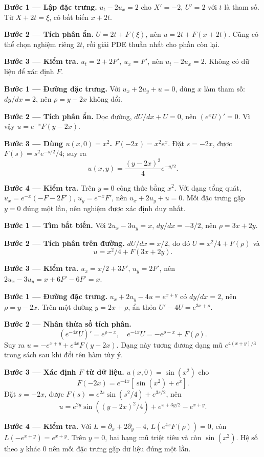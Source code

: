 \textbf{Bước 1 — Lập đặc trưng.} $u_t-2u_x=2$ cho $X'=-2$, $U'=2$ với $t$ là tham số. Từ $X+2t=\xi$, có bất biến $x+2t$.

\textbf{Bước 2 — Tích phân ẩn.} $U=2t+F(\xi)$, nên $u=2t+F(x+2t)$. Cũng có thể chọn nghiệm riêng $2t$, rồi giải PDE thuần nhất cho phần còn lại.

\textbf{Bước 3 — Kiểm tra.} $u_t=2+2F'$, $u_x=F'$, nên $u_t-2u_x=2$. Không có dữ liệu để xác định $F$.

\textbf{Bước 1 — Đường đặc trưng.} Với $u_x+2u_y+u=0$, dùng $x$ làm tham số: $dy/dx=2$, nên $\rho=y-2x$ không đổi.

\textbf{Bước 2 — Tích phân ẩn.} Dọc đường, $dU/dx+U=0$, nên $(e^xU)'=0$. Vì vậy $u=e^{-x}F(y-2x)$.

\textbf{Bước 3 — Dùng $u(x,0)=x^2$.} $F(-2x)=x^2e^x$. Đặt $s=-2x$, được $F(s)=s^2e^{-s/2}/4$; suy ra
\[u(x,y)=\frac{(y-2x)^2}{4}e^{-y/2}.\]

\textbf{Bước 4 — Kiểm tra.} Trên $y=0$ công thức bằng $x^2$. Với dạng tổng quát, $u_x=e^{-x}(-F-2F')$, $u_y=e^{-x}F'$, nên $u_x+2u_y+u=0$. Mỗi đặc trưng gặp $y=0$ đúng một lần, nên nghiệm được xác định duy nhất.

\textbf{Bước 1 — Tìm bất biến.} Với $2u_x-3u_y=x$, $dy/dx=-3/2$, nên $\rho=3x+2y$.

\textbf{Bước 2 — Tích phân trên đường.} $dU/dx=x/2$, do đó $U=x^2/4+F(\rho)$ và
\[u=x^2/4+F(3x+2y).\]

\textbf{Bước 3 — Kiểm tra.} $u_x=x/2+3F'$, $u_y=2F'$, nên $2u_x-3u_y=x+6F'-6F'=x$.

\textbf{Bước 1 — Đường đặc trưng.} $u_x+2u_y-4u=e^{x+y}$ có $dy/dx=2$, nên $\rho=y-2x$. Trên một đường $y=2x+\rho$, ẩn thỏa $U'-4U=e^{3x+\rho}$.

\textbf{Bước 2 — Nhân thừa số tích phân.}
\[(e^{-4x}U)'=e^{\rho-x},\quad e^{-4x}U=-e^{\rho-x}+F(\rho).\]
Suy ra $u=-e^{x+y}+e^{4x}F(y-2x)$. Dạng này tương đương dạng mũ $e^{4(x+y)/3}$ trong sách sau khi đổi tên hàm tùy ý.

\textbf{Bước 3 — Xác định $F$ từ dữ liệu.} $u(x,0)=\sin(x^2)$ cho
\[F(-2x)=e^{-4x}[\sin(x^2)+e^x].\]
Đặt $s=-2x$, được $F(s)=e^{2s}\sin(s^2/4)+e^{3s/2}$, nên
\[u=e^{2y}\sin((y-2x)^2/4)+e^{x+3y/2}-e^{x+y}.\]

\textbf{Bước 4 — Kiểm tra.} Với $L=\partial_x+2\partial_y-4$, $L(e^{4x}F(\rho))=0$, còn $L(-e^{x+y})=e^{x+y}$. Trên $y=0$, hai hạng mũ triệt tiêu và còn $\sin(x^2)$. Hệ số theo $y$ khác 0 nên mỗi đặc trưng gặp dữ liệu đúng một lần.

